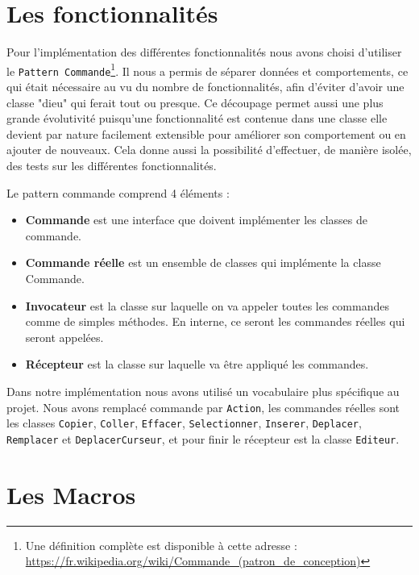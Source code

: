 \documentclass[french]{article}
\begin{document}
\section{Les fonctionnalités}\label{sec:fonctionnalités}
Pour l'implémentation des différentes fonctionnalités nous avons choisi d'utiliser le \texttt{Pattern Commande}\footnote{Une définition complète est disponible à cette adresse : \url{https://fr.wikipedia.org/wiki/Commande_(patron_de_conception)}}. Il nous a permis de séparer données et comportements, ce qui était nécessaire au vu du nombre de fonctionnalités, afin d'éviter d'avoir une classe "dieu" qui ferait tout ou presque. Ce découpage permet aussi une plus grande évolutivité puisqu'une fonctionnalité est contenue dans une classe elle devient par nature facilement extensible pour améliorer son comportement ou en ajouter de nouveaux. Cela donne aussi la possibilité d'effectuer, de manière isolée, des tests sur les différentes fonctionnalités.

Le pattern commande comprend 4 éléments :
\begin{itemize}
	\item \textbf{Commande} est une interface que doivent implémenter les classes de commande.
	\item \textbf{Commande réelle} est un ensemble de classes qui implémente la classe Commande.
	\item \textbf{Invocateur} est la classe sur laquelle on va appeler toutes les commandes comme de simples méthodes. En interne, ce seront les commandes réelles qui seront appelées.
	\item \textbf{Récepteur} est la classe sur laquelle va être appliqué les commandes.
\end{itemize}

Dans notre implémentation nous avons utilisé un vocabulaire plus spécifique au projet. Nous avons remplacé commande par \texttt{Action}, les commandes réelles sont les classes \texttt{Copier}, \texttt{Coller}, \texttt{Effacer}, \texttt{Selectionner}, \texttt{Inserer}, \texttt{Deplacer}, \texttt{Remplacer} et \texttt{DeplacerCurseur}, et pour finir le récepteur est la classe \texttt{Editeur}.

\section{Les Macros}\label{sec:macros}
\end{document}
